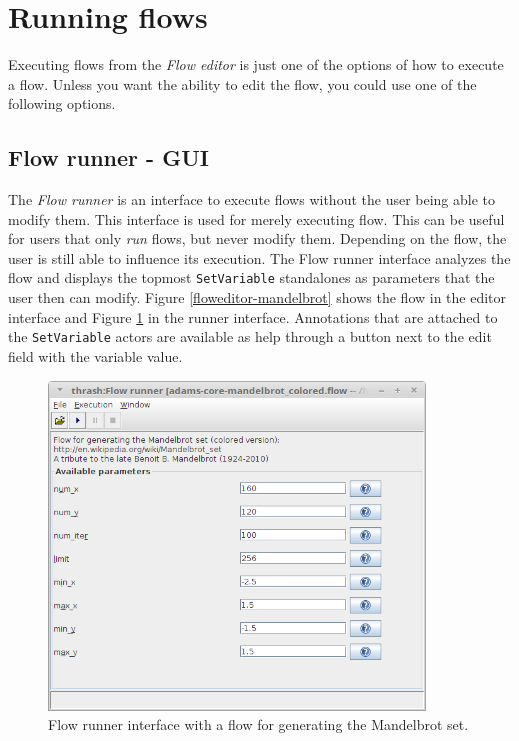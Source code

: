 \newpage
\section{Running flows}
\label{running_flows}
Executing flows from the \textit{Flow editor} is just one of the options of
how to execute a flow. Unless you want the ability to edit the flow, you could 
use one of the following options.

\subsection{Flow runner - GUI}
The \textit{Flow runner} is an interface to execute flows without the user
being able to modify them. This interface is used for merely executing flow.
This can be useful for users that only \textit{run} flows, but never modify
them. Depending on the flow, the user is still able to influence its 
execution. The Flow runner interface analyzes the flow and displays the 
topmost \texttt{SetVariable} standalones as parameters that the user then
can modify. Figure \ref{floweditor-mandelbrot} shows the flow in the editor
interface and Figure \ref{flowrunner-mandelbrot} in the runner interface.
Annotations that are attached to the \texttt{SetVariable} actors are available
as help through a button next to the edit field with the variable value.

\begin{figure}[htb]
  \centering
  \includegraphics[width=10.0cm]{images/flowrunner-mandelbrot.png}
  \caption{Flow runner interface with a flow for generating the Mandelbrot set.}
  \label{flowrunner-mandelbrot}
\end{figure}

